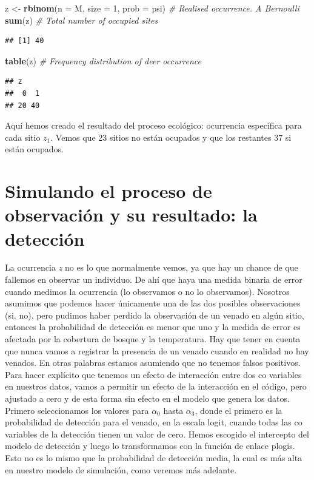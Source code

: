 \documentclass[]{book}
\newenvironment{Shaded}{\begin{snugshade}}{\end{snugshade}}
\newcommand{\KeywordTok}[1]{\textcolor[rgb]{0.13,0.29,0.53}{\textbf{{#1}}}}
\newcommand{\DataTypeTok}[1]{\textcolor[rgb]{0.13,0.29,0.53}{{#1}}}
\newcommand{\DecValTok}[1]{\textcolor[rgb]{0.00,0.00,0.81}{{#1}}}
\newcommand{\StringTok}[1]{\textcolor[rgb]{0.31,0.60,0.02}{{#1}}}
\newcommand{\CommentTok}[1]{\textcolor[rgb]{0.56,0.35,0.01}{\textit{{#1}}}}
\newcommand{\NormalTok}[1]{{#1}}
\begin{document}
\begin{Shaded}
\begin{Highlighting}[]
\NormalTok{z <-}\StringTok{ }\KeywordTok{rbinom}\NormalTok{(}\DataTypeTok{n =} \NormalTok{M, }\DataTypeTok{size =} \DecValTok{1}\NormalTok{, }\DataTypeTok{prob =} \NormalTok{psi)  }\CommentTok{# Realised occurrence. A Bernoulli}
\KeywordTok{sum}\NormalTok{(z)                                    }\CommentTok{# Total number of occupied sites}
\end{Highlighting}
\end{Shaded}

\begin{verbatim}
## [1] 40
\end{verbatim}

\begin{Shaded}
\begin{Highlighting}[]
\KeywordTok{table}\NormalTok{(z)                                  }\CommentTok{# Frequency distribution of deer occurrence}
\end{Highlighting}
\end{Shaded}

\begin{verbatim}
## z
##  0  1 
## 20 40
\end{verbatim}

Aquí hemos creado el resultado del proceso ecológico: ocurrencia
específica para cada sitio \(z _{1}\). Vemos que 23 sitios no están
ocupados y que los restantes 37 si están ocupados.

\section{Simulando el proceso de observación y su resultado: la
detección}\label{simulando-el-proceso-de-observacion-y-su-resultado-la-deteccion}

La ocurrencia \emph{z} no es lo que normalmente vemos, ya que hay un
chance de que fallemos en observar un individuo. De ahí que haya una
medida binaria de error cuando medimos la ocurrencia (lo observamos o no
lo observamos). Nosotros asumimos que podemos hacer únicamente una de
las dos posibles observaciones (si, no), pero pudimos haber perdido la
observación de un venado en algún sitio, entonces la probabilidad de
detección es menor que uno y la medida de error es afectada por la
cobertura de bosque y la temperatura. Hay que tener en cuenta que nunca
vamos a registrar la presencia de un venado cuando en realidad no hay
venados. En otras palabras estamos asumiendo que no tenemos falsos
positivos. Para hacer explícito que tenemos un efecto de interacción
entre dos co variables en nuestros datos, vamos a permitir un efecto de
la interacción en el código, pero ajustado a cero y de esta forma sin
efecto en el modelo que genera los datos. Primero seleccionamos los
valores para \(\alpha _{0}\) hasta \(\alpha _{3}\), donde el primero es
la probabilidad de detección para el venado, en la escala logit, cuando
todas las co variables de la detección tienen un valor de cero. Hemos
escogido el intercepto del modelo de detección y luego lo transformamos
con la función de enlace plogis. Esto no es lo mismo que la probabilidad
de detección media, la cual es más alta en nuestro modelo de simulación,
como veremos más adelante.
\end{document}
